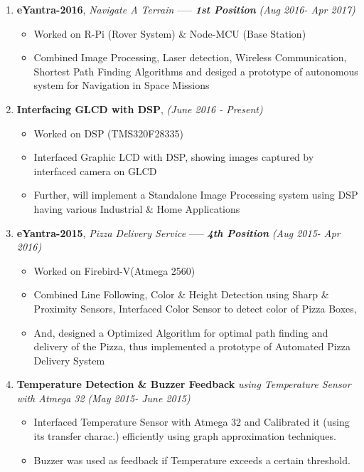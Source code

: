 \documentclass[10pt,a4paper,sans]{moderncv} %
\begin{document}
\begin{enumerate}

\item \textbf{eYantra-2016}, \textit{Navigate A Terrain}  ----- \textbf{\textit{1st Position}}       \textit{ (Aug 2016- Apr 2017) }
\begin{itemize}
\item Worked on R-Pi (Rover System) \& Node-MCU (Base Station)
\item Combined Image Processing, Laser detection, Wireless Communication, Shortest Path Finding Algorithms and desiged a prototype of autonomous system for Navigation in Space Missions
\newline
\end{itemize}

\item \textbf{Interfacing GLCD with DSP},     \textit{ (June 2016 - Present) }
\begin{itemize}
\item Worked on DSP (TMS320F28335)
\item Interfaced Graphic LCD with DSP, showing images captured by interfaced camera on GLCD
\item Further, will implement a Standalone Image Processing system using DSP having various Industrial \& Home Applications
\newline
\end{itemize}

\item \textbf{eYantra-2015}, \textit{Pizza Delivery Service} ----- \textbf{\textit{4th Position}}                  \textit{ (Aug 2015- Apr 2016) }
\begin{itemize}
\item Worked on Firebird-V(Atmega 2560)
\item Combined Line Following, Color \& Height Detection using Sharp \& Proximity Sensors, Interfaced Color Sensor to detect color of Pizza Boxes, 
\item And, designed a Optimized Algorithm for optimal path finding and delivery of the Pizza, thus implemented a prototype of Automated Pizza Delivery System
\newline
\end{itemize}

\item \textbf{Temperature Detection \& Buzzer Feedback} \textit{ using Temperature Sensor  with Atmega 32}  \textit{ (May 2015- June 2015) }
\begin{itemize}
\item Interfaced Temperature Sensor with Atmega 32 and Calibrated it (using its transfer charac.) efficiently using graph approximation techniques.
\item Buzzer was used as feedback if Temperature exceeds a certain threshold.
\end{itemize}

\end{enumerate}
\end{document}

